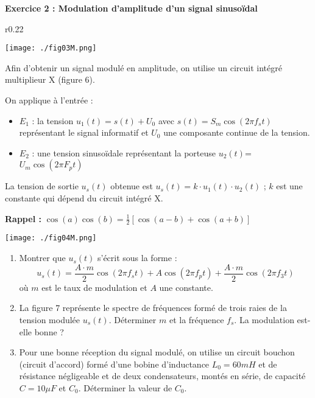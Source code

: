 \documentclass[12pt, french]{article}
\begin{document}
\begin{Box2}{\textbf{Exercice 2 : Modulation d’amplitude d’un signal sinusoïdal}}


\begin{wrapfigure}{r}{0.22\textwidth}
  \begin{center}
	  \vspace{-0.5cm}
	\texttt{[image: ./fig03M.png]}
  \end{center}
\end{wrapfigure}


Afin d'obtenir un signal modulé en amplitude, on utilise un circuit intégré multiplieur X (figure 6).

On applique à l'entrée :
\begin{itemize}
    \item $E_1$ : la tension $u_1(t) = s(t) + U_0$ avec $s(t) = S_m\cos(2\pi f_s t)$ représentant le signal informatif et $U_0$ une composante continue de la tension.
    \item $E_2$ : une tension sinusoïdale représentant la porteuse $u_2(t) $=$ U_m\cos(2\pi F_p t)$
\end{itemize}

La tension de sortie $u_s(t)$ obtenue est $u_s(t) = k\cdot u_1(t)\cdot u_2(t)$ ; $k$ est une constante qui dépend du circuit intégré X.

\textbf{Rappel :} $\cos(a)\cos(b) = \frac{1}{2}[\cos(a-b) + \cos(a+b)]$

  \begin{center}
	\texttt{[image: ./fig04M.png]}
  \end{center}

\begin{enumerate}
    \item Montrer que $u_s(t)$ s'écrit sous la forme :
    $$u_s(t) = \frac{A\cdot m}{2}\cos(2\pi f_s t) + A\cos(2\pi f_p t) + \frac{A\cdot m}{2}\cos(2\pi f_3 t)$$
    où $m$ est le taux de modulation et $A$ une constante.

    \item La figure 7 représente le spectre de fréquences formé de trois raies de la tension modulée $u_s(t)$. Déterminer $m$ et la fréquence $f_s$. La modulation est-elle bonne ?
    \item Pour une bonne réception du signal modulé, on utilise un circuit bouchon (circuit d'accord) formé d'une bobine d'inductance $L_0 = 60mH$ et de résistance négligeable et de deux condensateurs, montés en série, de capacité $C = 10\mu F$ et $C_0$. Déterminer la valeur de $C_0$.
\end{enumerate}
\end{Box2}
\end{document}
